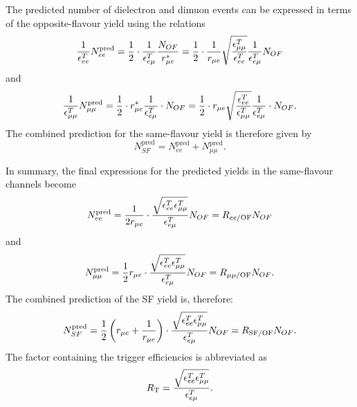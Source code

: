 The predicted number of dielectron and dimuon events can be expressed in terms of the opposite-flavour yield using the relations
\begin{equation*}
\frac{1}{\epsilon_{ee}^T} N_{ee}^{\text{pred}} = \frac{1}{2}\cdot \frac{1}{\epsilon_{e\mu}^T} \frac{N_{OF}}{r_{\mu e}^{*}} = \frac{1}{2}\cdot \frac{1}{r_{\mu e}} \sqrt{\frac{\epsilon_{\mu\mu}^T}{\epsilon_{ee}^T}} \frac{1}{\epsilon_{e\mu}^T} N_{OF}
\end{equation*}
and 
\begin{equation*}
\frac{1}{\epsilon_{\mu\mu}^T} N_{\mu\mu}^{\text{pred}} = \frac{1}{2} \cdot r_{\mu e}^{*} \frac{1}{\epsilon_{e\mu}^T} \cdot N_{OF} = \frac{1}{2} \cdot r_{\mu e} \sqrt{\frac{\epsilon_{ee}^T}{\epsilon_{\mu\mu}^T}} \frac{1}{\epsilon_{e\mu}^T} \cdot N_{OF}.
\end{equation*}
The combined prediction for the same-flavour yield is therefore given by
\begin{equation*}
N_{SF}^{\text{pred}} = N_{ee}^{\text{pred}} + N_{\mu\mu}^{\text{pred}}.
\end{equation*}

In summary, the final expressions for the predicted yields in the same-flavour channels become
\begin{equation}
N_{ee}^{\text{pred}} = \frac{1}{2r_{\mu e}} \cdot \frac{\sqrt{\epsilon_{ee}^T \epsilon_{\mu\mu}^T}}{\epsilon_{e\mu}^T} N_{OF} = R_\text{$ee$/OF} N_{OF}
\label{eq:nee}
\end{equation} 
and
\begin{equation}
N_{\mu\mu}^{\text{pred}} = \frac{1}{2}r_{\mu e}  \cdot \frac{\sqrt{\epsilon_{ee}^T \epsilon_{\mu\mu}^T}}{\epsilon_{e\mu}^T} N_{OF} = R_\text{$\mu\mu$/OF} N_{OF}.
\label{eq:nmm}
\end{equation} 
The combined prediction of the SF yield is, therefore:
\begin{equation}
N_{SF}^{\text{pred}} = \frac{1}{2}\left(r_{\mu e} + \frac{1}{r_{\mu e}}\right) \cdot \frac{\sqrt{\epsilon_{ee}^T \epsilon_{\mu\mu}^T}}{\epsilon_{e\mu}^T}  N_{OF} = R_{\text{SF/OF}} N_{OF}.
\label{eq:nsf}
\end{equation}
The factor containing the trigger efficiencies is abbreviated as
\begin{equation}
R_{\mathrm{T}} = \frac{\sqrt{\epsilon_{ee}^T \epsilon_{\mu\mu}^T}}{\epsilon_{e\mu}^T}.
\label{eq:RT}
\end{equation}
